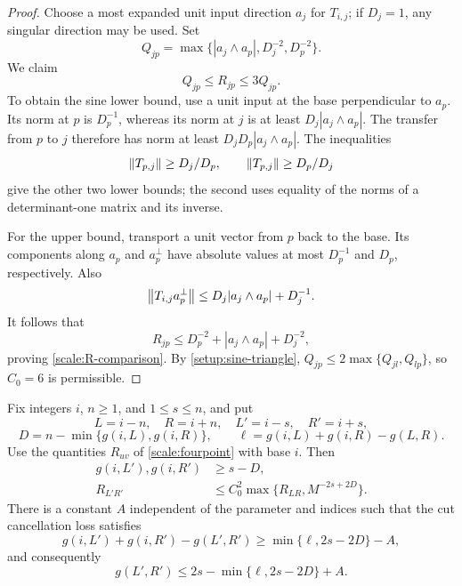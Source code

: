 \begin{proof}
Choose a most expanded unit input direction $a_j$ for $T_{i,j}$;
if $D_j=1$, any singular direction may be used. Set
\[
 Q_{jp}=\max\{|a_j\wedge a_p|,D_j^{-2},D_p^{-2}\}.
\]
We claim
\begin{equation}\label{scale:R-comparison}
 Q_{jp}\le R_{jp}\le3Q_{jp}.
\end{equation}
To obtain the sine lower bound, use a unit input at the base
perpendicular to $a_p$. Its norm at $p$ is $D_p^{-1}$, whereas its
norm at $j$ is at least $D_j|a_j\wedge a_p|$. The transfer from $p$
to $j$ therefore has norm at least $D_jD_p|a_j\wedge a_p|$.
The inequalities
\[
 \left\lVert T_{p,j}\right\rVert\ge D_j/D_p,\qquad
 \left\lVert T_{p,j}\right\rVert\ge D_p/D_j
\]
give the other two lower bounds; the second uses equality of the norms
of a determinant-one matrix and its inverse.

For the upper bound, transport a unit vector from $p$ back to the
base. Its components along $a_p$ and $a_p^\perp$ have absolute values
at most $D_p^{-1}$ and $D_p$, respectively. Also
\[
 \left\lVert T_{i,j}a_p^\perp\right\rVert
 \le D_j|a_j\wedge a_p|+D_j^{-1}.
\]
It follows that
\[
 R_{jp}\le D_p^{-2}+|a_j\wedge a_p|+D_j^{-2},
\]
proving \cref{scale:R-comparison}. By
\cref{setup:sine-triangle},
$Q_{jp}\le2\max\{Q_{jl},Q_{lp}\}$, so $C_0=6$ is permissible.
\end{proof}

\begin{lemma}\label{scale:truncation}
Fix integers $i$, $n\ge1$, and $1\le s\le n$, and put
\[
 L=i-n,\quad R=i+n,\quad L'=i-s,\quad R'=i+s,
\]
\[
 D=n-\min\{g(i,L),g(i,R)\},\qquad
 \ell=g(i,L)+g(i,R)-g(L,R).
\]
Use the quantities $R_{uv}$ of \cref{scale:fourpoint} with base $i$.
Then
\begin{align}
 g(i,L'),g(i,R')&\ge s-D,
 \label{scale:cut-wings}\\
 R_{L'R'}&\le C_0^2\max\{R_{LR},M^{-2s+2D}\}.
 \label{scale:cut-R}
\end{align}
There is a constant $A$ independent of the parameter and indices such
that the cut cancellation loss satisfies
\begin{equation}\label{scale:cut-loss}
 g(i,L')+g(i,R')-g(L',R')
 \ge\min\{\ell,2s-2D\}-A,
\end{equation}
and consequently
\begin{equation}\label{scale:cut-full}
 g(L',R')\le2s-\min\{\ell,2s-2D\}+A.
\end{equation}
\end{lemma}

